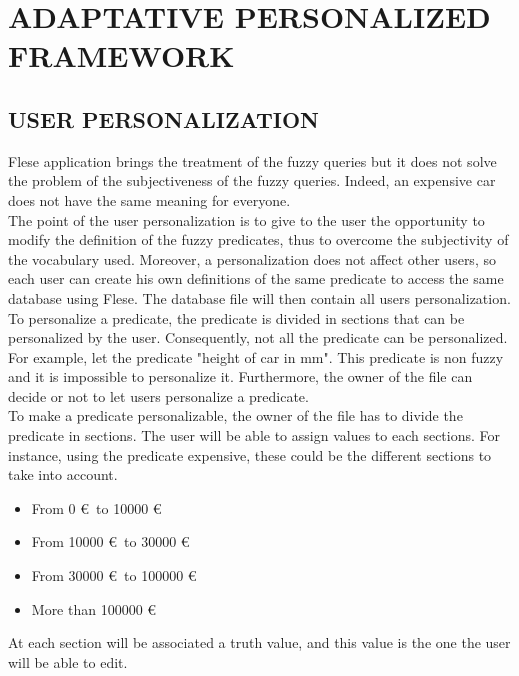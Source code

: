 \documentclass[a4paper,twoside]{article}
\begin{document}
\section{\uppercase{\uppercase{Adaptative personalized framework}}}

\subsection{\uppercase{user personalization}}

Flese application brings the treatment of the fuzzy queries but it does not solve the problem of the subjectiveness of the fuzzy queries. Indeed, an expensive car does not have the same meaning for everyone.\\

The point of the user personalization is to give to the user the opportunity to modify the definition of the fuzzy predicates, thus to overcome the subjectivity of the vocabulary used. Moreover, a personalization does not affect other users, so each user can create his own definitions of the same predicate to access the same database using Flese. The database file will then contain all users personalization.\\

To personalize a predicate, the predicate is divided in sections that can be personalized by the user. Consequently, not all the predicate can be personalized. For example, let the predicate "height of car in mm". This predicate is non fuzzy and it is impossible to personalize it. Furthermore, the owner of the file can decide or not to let users personalize a predicate. \\

To make a predicate personalizable, the owner of the file has to divide the predicate in sections. The user will be able to assign values to each sections. For instance, using the predicate expensive, these could be the different sections to take into account.

\begin{itemize}
    \item From 0 \euro\ to 10000 \euro
    \item  From 10000 \euro\ to 30000 \euro
    \item  From 30000 \euro\ to 100000 \euro
    \item  More than 100000 \euro
\end{itemize}

At each section will be associated a truth value, and this value is the one the user will be able to edit.\\
\end{document}
